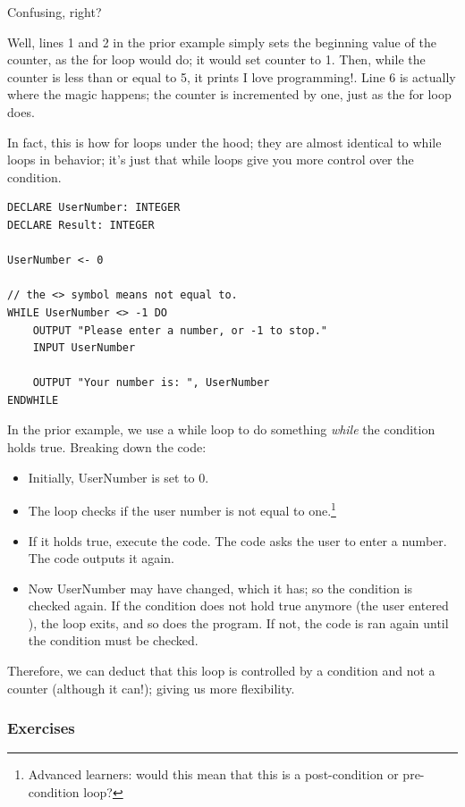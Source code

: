 \documentclass[./main.tex]{subfiles}
\begin{document}
Confusing, right?

Well, lines 1 and 2 in the prior example simply sets the beginning value of the counter, as the for loop would do; it would set counter to 1. Then, while the counter is less than or equal to 5, it prints {\ccmono I love programming!}. Line 6 is actually where the magic happens; the counter is incremented by one, just as the for loop does.

In fact, this is how for loops under the hood; they are almost identical to while loops in behavior; it's just that while loops give you more control over the condition.

\begin{verbatim}
DECLARE UserNumber: INTEGER
DECLARE Result: INTEGER

UserNumber <- 0

// the <> symbol means not equal to.
WHILE UserNumber <> -1 DO 
    OUTPUT "Please enter a number, or -1 to stop."
    INPUT UserNumber

    OUTPUT "Your number is: ", UserNumber
ENDWHILE
\end{verbatim}

In the prior example, we use a while loop to do something \emph{while} the condition holds true. Breaking down the code:

\begin{itemize}
    \item Initially, {\ccmono UserNumber} is set to 0.
    \item The loop checks if the user number is not equal to one.\footnote{Advanced learners: would this mean that this is a post-condition or pre-condition loop?}
    \item If it holds true, execute the code. The code asks the user to enter a number. The code outputs it again.
    \item Now {\ccmono UserNumber} may have changed, which it has; so the condition is checked again. If the condition does not hold true anymore (the user entered {}), the loop exits, and so does the program. If not, the code is ran again until the condition must be checked.
\end{itemize}

Therefore, we can deduct that this loop is controlled by a condition and not a counter (although it can!); giving us more flexibility.

\subsubsection{Exercises}
\label{ex:2_3_1}
\end{document}
